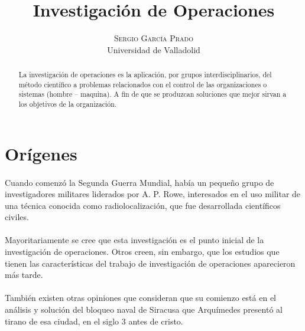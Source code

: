 \documentclass[12pt, a4paper,spanish]{article}
\title{\vspace{-15mm}\fontsize{24pt}{10pt}\selectfont\textbf{Investigación de Operaciones}} %
\author{
\large
\textsc{Sergio García Prado}\\[2mm] %
\normalsize Universidad de Valladolid \\ %
\vspace{-5mm}
}
\date{}
\begin{document}
	\maketitle %

	\thispagestyle{fancy} %


	\begin{abstract}
		\noindent La investigación de operaciones es la aplicación, por grupos interdisciplinarios, del método científico  a problemas relacionados con el control de las organizaciones o sistemas (hombre – maquina). A fin de que se produzcan soluciones que mejor sirvan a los objetivos de la organización. \cite{churchman_ackoff_Arnoff_io}
	\end{abstract}

	\section{Orígenes}

		\paragraph{}
		Cuando comenzó la Segunda Guerra Mundial, había un pequeño grupo de investigadores militares liderados por A. P. Rowe, interesados en el uso militar de una técnica conocida como radiolocalización, que fue desarrollada científicos civiles.\cite{wikipedia_IO}

		\paragraph{}
		Mayoritariamente se cree que esta investigación es el punto inicial de la investigación de operaciones. Otros creen, sin embargo, que los estudios que tienen las características del trabajo de investigación de operaciones aparecieron más tarde.\cite{wikipedia_IO}

		\paragraph{}
		También existen otras opiniones que consideran que su comienzo está en el análisis y solución del bloqueo naval de Siracusa que Arquímedes presentó al tirano de esa ciudad, en el siglo 3 antes de cristo.\cite{wikipedia_IO}
\end{document}
